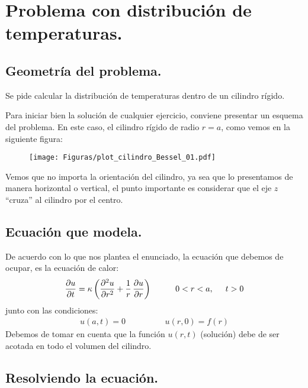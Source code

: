 \documentclass[12pt]{article}
\numberwithin{equation}{section}
\begin{document}
\section{Problema con distribución de temperaturas.}
\subsection{Geometría del problema.}

Se pide calcular la distribución de temperaturas dentro de un cilindro rígido.
\par
Para iniciar bien la solución de cualquier ejercicio, conviene presentar un esquema del problema. En este caso, el cilindro rígido de radio $r = a$, como vemos en la siguiente figura:
\begin{figure}[H]
    \centering
    \texttt{[image: Figuras/plot\_cilindro\_Bessel\_01.pdf]}
\end{figure}
Vemos que no importa la orientación del cilindro, ya sea que lo presentamos de manera horizontal o vertical, el punto importante es considerar que el eje $z$ \enquote{cruza} al cilindro por el centro.

\subsection{Ecuación que modela.}

De acuerdo con lo que nos plantea el enunciado, la ecuación que debemos de ocupar, es la ecuación de calor:
\begin{align}
\pdv{u}{t} = \kappa \left( \pdv[2]{u}{r} + \dfrac{1}{r}  \, \pdv{u}{r} \right) \hspace{1cm} 0 < r < a, \hspace{0.5cm} t > 0
\label{eq:ecuacion_CilBessel_01}
\end{align}
junto con las condiciones:
\begin{align}
u (a, t) = 0 \hspace{2cm} u (r, 0) = f (r)
\label{eq:ecuacion_CilBessel_02}
\end{align}
Debemos de tomar en cuenta que la función $u (r, t)$ (solución) debe de ser acotada en todo el volumen del cilindro.

\subsection{Resolviendo la ecuación.}
\end{document}
